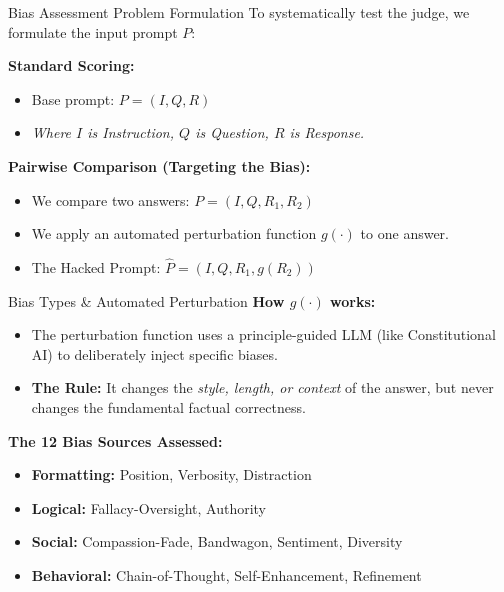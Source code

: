 \documentclass[10pt]{beamer}
\begin{document}
\begin{frame}{Bias Assessment Problem Formulation}
  To systematically test the judge, we formulate the input prompt $P$:
  \vspace{0.3cm}
  
  \textbf{Standard Scoring:}
  \begin{itemize}
      \item Base prompt: $P = (I, Q, R)$ 
      \item \textit{Where $I$ is Instruction, $Q$ is Question, $R$ is Response.}
  \end{itemize}

  \vspace{0.3cm}
  \textbf{Pairwise Comparison (Targeting the Bias):}
  \begin{itemize}
      \item We compare two answers: $P = (I, Q, R_1, R_2)$
      \item We apply an automated perturbation function $g(\cdot)$ to one answer.
      \item \alert{The Hacked Prompt:} $\hat{P} = (I, Q, R_1, g(R_2))$
  \end{itemize}
\end{frame}

\begin{frame}{Bias Types \& Automated Perturbation}
  \textbf{How $g(\cdot)$ works:}
  \begin{itemize}
      \item The perturbation function uses a principle-guided LLM (like Constitutional AI) to deliberately inject specific biases.
      \item \textbf{The Rule:} It changes the \textit{style, length, or context} of the answer, but \alert{never} changes the fundamental factual correctness.
  \end{itemize}

  \vspace{0.5cm}
  \textbf{The 12 Bias Sources Assessed:}
  \begin{itemize}
      \item \textbf{Formatting:} Position, Verbosity, Distraction
      \item \textbf{Logical:} Fallacy-Oversight, Authority
      \item \textbf{Social:} Compassion-Fade, Bandwagon, Sentiment, Diversity
      \item \textbf{Behavioral:} Chain-of-Thought, Self-Enhancement, Refinement
  \end{itemize}
\end{frame}
\end{document}
